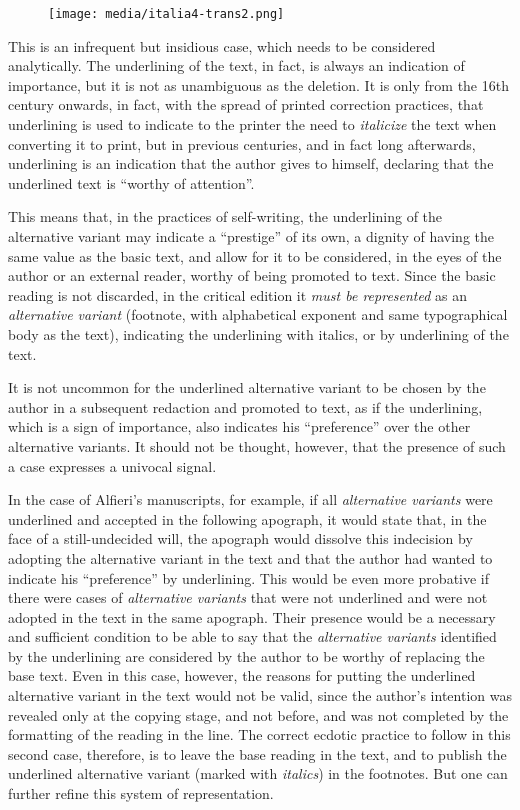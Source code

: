 \documentclass{article}
\begin{document}
\begin{figure}
    \centering
    \texttt{[image: media/italia4-trans2.png]}
\end{figure}


\noindent This is an infrequent but insidious case, which needs to be considered analytically. The underlining of the text, in fact, is always an indication of
importance, but it is not as unambiguous as the deletion. It is only
from the 16th century onwards, in fact, with the spread of printed
correction practices, that underlining is used to indicate to the
printer the need to \emph{italicize} the text when converting it to
print, but in previous centuries, and in fact long afterwards,
underlining is an indication that the author gives to himself, declaring
that the underlined text is ``worthy of attention''.

This means that, in the practices of self-writing, the underlining of
the alternative variant may indicate a ``prestige'' of its own, a dignity
of having the same value as the basic text, and allow for it to be
considered, in the eyes of the author or an external reader, worthy of
being promoted to text. Since the basic reading is not discarded, in the
critical edition it \emph{must be represented} as an \emph{alternative
variant} (footnote, with alphabetical exponent and same typographical
body as the text), indicating the underlining with italics, or by
underlining of the text.

It is not uncommon for the underlined alternative variant to be chosen
by the author in a subsequent redaction and promoted to text, as if the
underlining, which is a sign of importance, also indicates his
``preference'' over the other alternative variants. It should not be
thought, however, that the presence of such a case expresses a univocal
signal.

In the case of Alfieri's manuscripts, for example, if all
\emph{alternative variants} were underlined and accepted in the
following apograph, it would state that, in the face of a
still-undecided will, the apograph would dissolve this indecision by
adopting the alternative variant in the text and that the author had
wanted to indicate his ``preference'' by underlining. This would be even
more probative if there were cases of \emph{alternative variants} that
were not underlined and were not adopted in the text in the same
apograph. Their presence would be a necessary and sufficient condition
to be able to say that the \emph{alternative variants} identified by the
underlining are considered by the author to be worthy of replacing the
base text. Even in this case, however, the reasons for putting the
underlined alternative variant in the text would not be valid, since the
author's intention was revealed only at the copying stage, and not
before, and was not completed by the formatting of the reading in the
line. The correct ecdotic practice to follow in this second case,
therefore, is to leave the base reading in the text, and to publish the
underlined alternative variant (marked with \emph{italics}) in the
footnotes. But one can further refine this system of representation.
\end{document}
